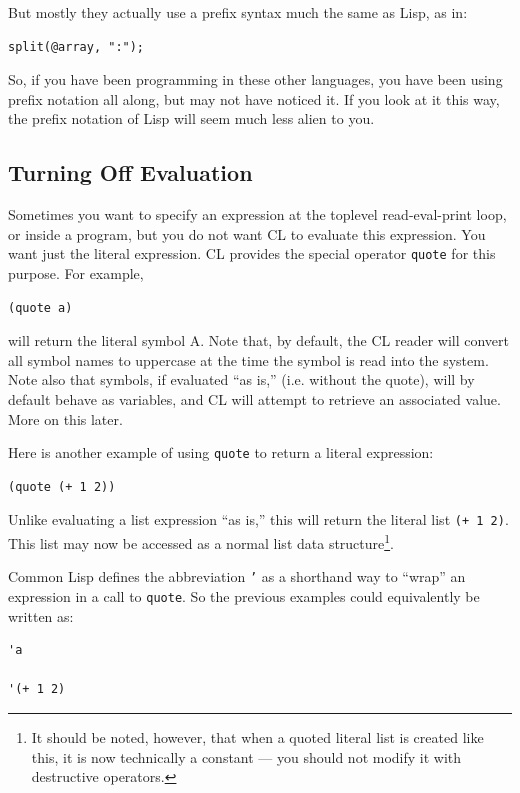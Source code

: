 But mostly they actually use a prefix syntax much the same as Lisp, as in:

\begin{verbatim}
split(@array, ":");
\end{verbatim}

So, if you have been programming in these other languages, you have been using prefix
notation all along, but may not have noticed it. If you look at it this way, the prefix
notation of Lisp will seem much less alien to you.

\subsection{Turning Off Evaluation}

Sometimes you want to specify an expression at the toplevel read-eval-print loop, or inside
a program, but you do not want CL to evaluate this expression. You want just the literal
expression. CL provides the special operator \texttt{quote} for this purpose. For example,

\begin{verbatim}
(quote a)
\end{verbatim}

will return the literal symbol A. Note that, by default, the CL reader will convert all symbol
names to uppercase at the time the symbol is read into the system. Note also that symbols,
if evaluated ``as is,'' (i.e. without the quote), will by default behave as variables, and CL
will attempt to retrieve an associated value. More on this later.

Here is another example of using \texttt{quote} to return a literal expression:

\begin{verbatim}
(quote (+ 1 2))
\end{verbatim}

Unlike evaluating a list expression ``as is,'' this will return the literal list \texttt{(+ 1 2)}. This list
may now be accessed as a normal list data structure\footnote{It should be noted, however, that when a quoted literal list is created like this, it is now technically a
constant --- you should not modify it with destructive operators.}.

Common Lisp defines the abbreviation \texttt{'} as a shorthand way to ``wrap'' an expression
in a call to \texttt{quote}. So the previous examples could equivalently be written as:

\begin{verbatim}
'a

'(+ 1 2)
\end{verbatim}


